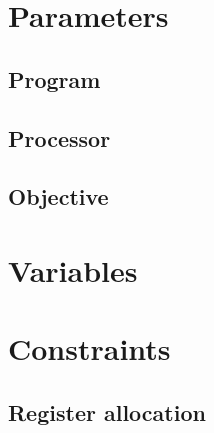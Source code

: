 \documentclass[11pt]{report}
\begin{document}
\section{Parameters}\label{sec:parameters}


\subsection{Program}



\subsection{Processor}



\subsection{Objective}



\section{Variables}



\section{Constraints}



\subsection{Register allocation}
\end{document}
